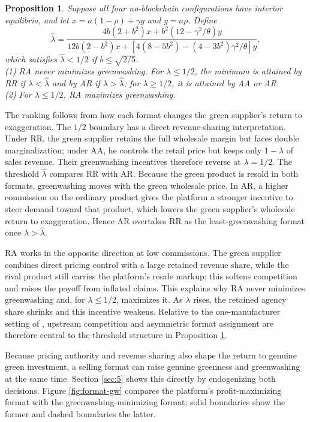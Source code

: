 \documentclass[preprint,review,12pt,authoryear,nopreprintline]{elsarticle}
\newtheorem{proposition}{Proposition}
\theoremstyle{definition}
\begin{document}
\begin{proposition}\label{prop:ranking}
Suppose all four no-blockchain configurations have interior equilibria, and let $x=a(1-\rho)+\gamma g$ and $y=a\rho$. Define
\begin{equation*}
\hat{\lambda}=\frac{4b(2+b^2)x+b^2(12-\gamma^2/\theta)y}{12b(2-b^2)x+[4(8-5b^2)-(4-3b^2)\gamma^2/\theta]y},
\end{equation*}
which satisfies $\hat{\lambda}<1/2$ if $b\leq\sqrt{2/5}$.\\
(1) RA never minimizes greenwashing. For $\lambda\leq1/2$, the minimum is attained by RR if $\lambda<\hat{\lambda}$ and by AR if $\lambda>\hat{\lambda}$; for $\lambda\geq1/2$, it is attained by AA or AR.\\
(2) For $\lambda\leq1/2$, RA maximizes greenwashing.
\end{proposition}

The ranking follows from how each format changes the green supplier's return to exaggeration. The $1/2$ boundary has a direct revenue-sharing interpretation. Under RR, the green supplier retains the full wholesale margin but faces double marginalization; under AA, he controls the retail price but keeps only $1-\lambda$ of sales revenue. Their greenwashing incentives therefore reverse at $\lambda=1/2$. The threshold $\hat{\lambda}$ compares RR with AR. Because the green product is resold in both formats, greenwashing moves with the green wholesale price. In AR, a higher commission on the ordinary product gives the platform a stronger incentive to steer demand toward that product, which lowers the green supplier's wholesale return to exaggeration. Hence AR overtakes RR as the least-greenwashing format once $\lambda>\hat{\lambda}$.

RA works in the opposite direction at low commissions. The green supplier combines direct pricing control with a large retained revenue share, while the rival product still carries the platform's resale markup; this softens competition and raises the payoff from inflated claims. This explains why RA never minimizes greenwashing and, for $\lambda\leq1/2$, maximizes it. As $\lambda$ rises, the retained agency share shrinks and this incentive weakens. Relative to the one-manufacturer setting of \citet{xu2025should}, upstream competition and asymmetric format assignment are therefore central to the threshold structure in Proposition \ref{prop:ranking}.

Because pricing authority and revenue sharing also shape the return to genuine green investment, a selling format can raise genuine greenness and greenwashing at the same time. Section \ref{sec:5} shows this directly by endogenizing both decisions. Figure \ref{fig:format-gw} compares the platform's profit-maximizing format with the greenwashing-minimizing format; solid boundaries show the former and dashed boundaries the latter.
\end{document}
